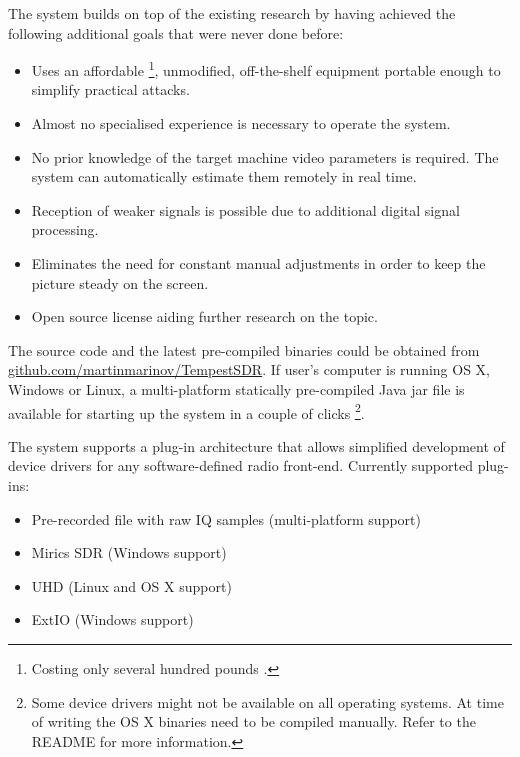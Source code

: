 \documentclass[a4paper,12pt,twoside,openright]{report}
\begin{document}
The system builds on top of the existing research by having achieved the following additional goals that were never done before:

\begin{itemize}

  \item Uses an affordable \footnote{Costing only several hundred pounds \cite{ettusb200}.}, unmodified, off-the-shelf equipment portable enough to simplify practical attacks.
  \item Almost no specialised experience is necessary to operate the system.
  \item No prior knowledge of the target machine video parameters is required. The system can automatically estimate them remotely in real time.
  \item Reception of weaker signals is possible due to additional digital signal processing.
  \item Eliminates the need for constant manual adjustments in order to keep the picture steady on the screen.
  \item Open source license aiding further research on the topic.

\end{itemize}

The source code and the latest pre-compiled binaries could be obtained from \href{https://github.com/martinmarinov/TempestSDR}{github.com/martinmarinov/TempestSDR}. If user's computer is running OS X, Windows or Linux, a multi-platform statically pre-compiled Java jar file is available for starting up the system in a couple of clicks \footnote{Some device drivers might not be available on all operating systems. At time of writing the OS X binaries need to be compiled manually. Refer to the README for more information.}.

The system supports a plug-in architecture that allows simplified development of device drivers for any software-defined radio front-end. Currently supported plug-ins:

\begin{itemize}

  \item Pre-recorded file with raw IQ samples (multi-platform support)
  \item Mirics SDR (Windows support)
  \item UHD (Linux and OS X support)
  \item ExtIO (Windows support)

\end{itemize}
\end{document}
